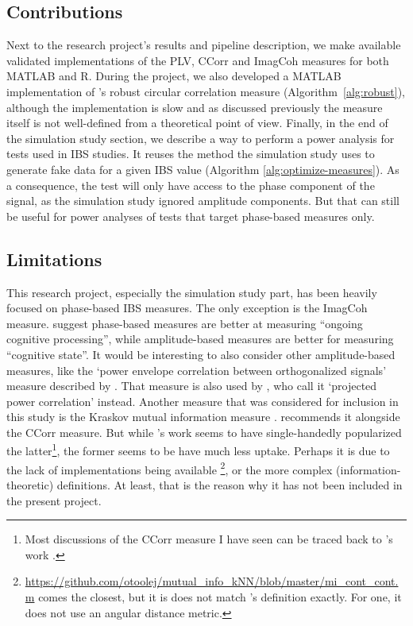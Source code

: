 \subsection{Contributions}

Next to the research project's results and pipeline description, we make
available validated implementations of the PLV, CCorr and ImagCoh measures for
both MATLAB and R. During the project, we also developed a MATLAB implementation
of \textcite{mahmood_robust_2022}'s robust circular correlation measure
(Algorithm~\ref{alg:robust}), although the implementation is slow and as
discussed previously the measure itself is not well-defined from a theoretical
point of view. Finally, in the end of the simulation study section, we
describe a way to perform a power analysis for tests used in IBS studies. It
reuses the method the simulation study uses to generate fake data for a given
IBS value (Algorithm \ref{alg:optimize-measures}). As a consequence, the
test will only have access to the phase component of the signal, as the
simulation study ignored amplitude components. But that can still be useful for
power analyses of tests that target phase-based measures only.

\subsection{Limitations}

This research project, especially the simulation study part, has been heavily
focused on phase-based IBS measures. The only exception is the ImagCoh measure.
\textcite{ayrolles_hypyp_2021} suggest phase-based measures are better at
measuring ``ongoing cognitive processing'', while amplitude-based measures are
better for measuring ``cognitive state''. It would be interesting to also
consider other amplitude-based measures, like the `power envelope correlation
between orthogonalized signals' measure described by
\textcite{hipp_large-scale_2012}. That measure is also used by
\textcite{dikker_crowdsourcing_2021}, who call it `projected power correlation'
instead. Another measure that was considered for inclusion in this study is the
Kraskov mutual information measure \parencite{kraskov_estimating_2004}.
\textcite{burgess_interpretation_2013} recommends it alongside the CCorr
measure. But while \citeauthor{burgess_interpretation_2013}'s work seems to have
single-handedly popularized the latter\footnote{Most discussions of the CCorr
measure I have seen can be traced back to
\textcite{burgess_interpretation_2013}'s work
\parencite[to name just a few]{chen_trait_2021,farahzadi_towards_2021,kurihara_relationship_2022,wikstrom_inter-brain_2022,goldstein_brain--brain_2018,kingsbury_multi-brain_2020}.},
the former seems to be have much less uptake. Perhaps it is due to the lack of
implementations being available
\footnote{\url{https://github.com/otoolej/mutual_info_kNN/blob/master/mi_cont_cont.m}
comes the closest, but it is does not match
\citeauthor{burgess_interpretation_2013}'s definition exactly. For one, it does
not use an angular distance metric.}, or the more complex
(information-theoretic) definitions. At least, that is the reason why it has not
been included in the present project.

